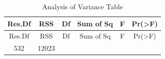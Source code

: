 \documentclass[]{article}
\begin{document}
\begin{longtable}[]{@{}cccccc@{}}
\caption{Analysis of Variance Table}\tabularnewline
\toprule
\begin{minipage}[b]{0.10\columnwidth}\centering\strut
Res.Df\strut
\end{minipage} & \begin{minipage}[b]{0.09\columnwidth}\centering\strut
RSS\strut
\end{minipage} & \begin{minipage}[b]{0.06\columnwidth}\centering\strut
Df\strut
\end{minipage} & \begin{minipage}[b]{0.14\columnwidth}\centering\strut
Sum of Sq\strut
\end{minipage} & \begin{minipage}[b]{0.09\columnwidth}\centering\strut
F\strut
\end{minipage} & \begin{minipage}[b]{0.13\columnwidth}\centering\strut
Pr(\textgreater{}F)\strut
\end{minipage}\tabularnewline
\midrule
\endfirsthead
\toprule
\begin{minipage}[b]{0.10\columnwidth}\centering\strut
Res.Df\strut
\end{minipage} & \begin{minipage}[b]{0.09\columnwidth}\centering\strut
RSS\strut
\end{minipage} & \begin{minipage}[b]{0.06\columnwidth}\centering\strut
Df\strut
\end{minipage} & \begin{minipage}[b]{0.14\columnwidth}\centering\strut
Sum of Sq\strut
\end{minipage} & \begin{minipage}[b]{0.09\columnwidth}\centering\strut
F\strut
\end{minipage} & \begin{minipage}[b]{0.13\columnwidth}\centering\strut
Pr(\textgreater{}F)\strut
\end{minipage}\tabularnewline
\midrule
\endhead
\begin{minipage}[t]{0.10\columnwidth}\centering\strut
532\strut
\end{minipage} & \begin{minipage}[t]{0.09\columnwidth}\centering\strut
12023\strut
\end{minipage} & \begin{minipage}[t]{0.06\columnwidth}\centering\strut

\end{minipage}
\end{longtable}
\end{document}
